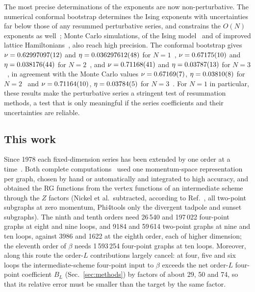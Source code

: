 The most precise determinations of the exponents are now non-perturbative. The numerical conformal bootstrap
determines the Ising exponents with uncertainties far below those of any resummed perturbative series, and
constrains the $O(N)$ exponents as well~\cite{KosPolandSimmonsDuffinVichi2016,PolandRychkovVichi2019}; Monte Carlo
simulations, of the Ising model~\cite{FerrenbergXuLandau2018} and of improved lattice
Hamiltonians~\cite{Hasenbusch2010,Hasenbusch2019,Hasenbusch2020}, also reach high precision. The conformal bootstrap gives $\nu=0.62997097(12)$ and
$\eta=0.036297612(48)$ for $N=1$~\cite{ChangEtAl2025}, $\nu=0.67175(10)$ and
$\eta=0.038176(44)$ for $N=2$~\cite{ChesterEtAl2020}, and $\nu=0.71168(41)$ and $\eta=0.03787(13)$ for
$N=3$~\cite{ChesterEtAl2021}, in agreement with the Monte Carlo values $\nu=0.67169(7)$, $\eta=0.03810(8)$
for $N=2$~\cite{Hasenbusch2019} and $\nu=0.71164(10)$, $\eta=0.03784(5)$ for $N=3$~\cite{Hasenbusch2020}.
For $N=1$ in particular, these results make the perturbative series a stringent test of resummation methods, a
test that is only meaningful if the series coefficients and their uncertainties are reliable.

\subsection{This work}
\label{sec:intro-this-work}

Since 1978 each fixed-dimension series has been extended by one order at a
time~\cite{MurrayNickel1991,Phi4tools2024}. Both complete computations~\cite{NMB1977,Phi4tools2024} used one
momentum-space representation per graph, chosen by hand or automatically and integrated to high accuracy, and
obtained the RG functions from the vertex functions of an intermediate scheme through the $Z$ factors (Nickel et
al.\ subtracted, according to Ref.~\cite{Phi4tools2024}, all two-point subgraphs at zero momentum, Phi4tools only the divergent tadpole and sunset
subgraphs). The ninth and tenth orders need 26\,540 and 197\,022 four-point graphs at eight and nine loops, and
9184 and 59\,614 two-point graphs at nine and ten loops, against 3986 and 1622 at the eighth order, each of higher
dimension; the eleventh order of $\beta$ needs 1\,593\,254 four-point graphs at ten loops. Moreover, along this route the order-$L$
contributions largely cancel: at four, five and six loops the intermediate-scheme four-point input to $\beta$ exceeds
the net order-$L$ four-point coefficient $B_L$ (Sec.~\ref{sec:methods}) by factors of about 29, 50 and 74, so that its relative
error must be smaller than the target by the same factor.

